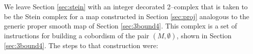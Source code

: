 We leave Section \ref{sec:stein} with an integer decorated 2--complex that is taken to be the Stein complex for a map constructed in Section \ref{sec:proj} analogous to the generic proper smooth map of Section \ref{sec:3bound4}.
This complex is a set of instructions for building a cobordism of the pair $(M,\emptyset)$, shown in Section \ref{sec:3bound4}.
The steps to that construction were:
